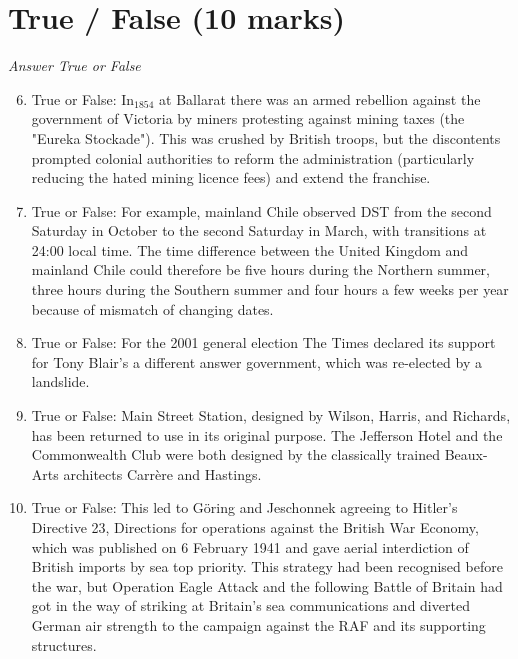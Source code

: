 \documentclass[12pt]{article}
\begin{document}
\section*{True / False (10 marks)}
\textit{Answer True or False}
\begin{enumerate}[label=\arabic*.]
\setcounter{enumi}{5}
\item True or False: In$_{1854}$ at Ballarat there was an armed rebellion against the government of Victoria by miners protesting against mining taxes (the "Eureka Stockade"). This was crushed by British troops, but the discontents prompted colonial authorities to reform the administration (particularly reducing the hated mining licence fees) and extend the franchise.
\item True or False: For example, mainland Chile observed DST from the second Saturday in October to the second Saturday in March, with transitions at 24:00 local time. The time difference between the United Kingdom and mainland Chile could therefore be five hours during the Northern summer, three hours during the Southern summer and four hours a few weeks per year because of mismatch of changing dates.
\item True or False: For the 2001 general election The Times declared its support for Tony Blair's a different answer government, which was re-elected by a landslide.
\item True or False: Main Street Station, designed by Wilson, Harris, and Richards, has been returned to use in its original purpose. The Jefferson Hotel and the Commonwealth Club were both designed by the classically trained Beaux-Arts architects Carrère and Hastings.
\item True or False: This led to Göring and Jeschonnek agreeing to Hitler's Directive 23, Directions for operations against the British War Economy, which was published on 6 February 1941 and gave aerial interdiction of British imports by sea top priority. This strategy had been recognised before the war, but Operation Eagle Attack and the following Battle of Britain had got in the way of striking at Britain's sea communications and diverted German air strength to the campaign against the RAF and its supporting structures.
\end{enumerate}
\end{document}
